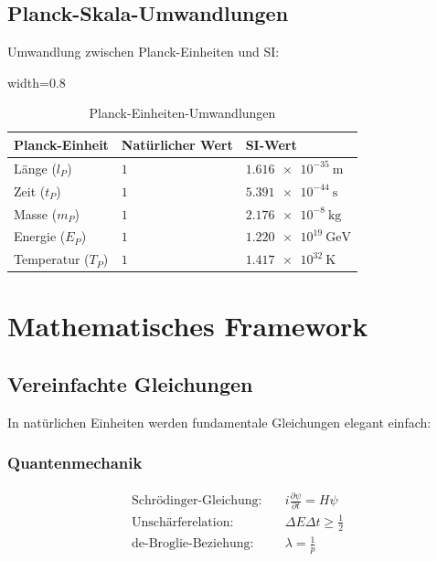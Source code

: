 	\subsection{Planck-Skala-Umwandlungen}
	
	Umwandlung zwischen Planck-Einheiten und SI:
	
	\begin{table}[htbp]
		\centering
		\begin{adjustbox}{width=0.8\textwidth}
			\begin{tabular}{lll}
				\toprule
				\textbf{Planck-Einheit} & \textbf{Natürlicher Wert} & \textbf{SI-Wert} \\
				\midrule
				Länge ($l_P$) & $1$ & $\SI{1.616e-35}{\meter}$ \\
				Zeit ($t_P$) & $1$ & $\SI{5.391e-44}{\second}$ \\
				Masse ($m_P$) & $1$ & $\SI{2.176e-8}{\kilogram}$ \\
				Energie ($E_P$) & $1$ & $\SI{1.220e19}{\giga\electronvolt}$ \\
				Temperatur ($T_P$) & $1$ & $\SI{1.417e32}{\kelvin}$ \\
				\bottomrule
			\end{tabular}
		\end{adjustbox}
		\caption{Planck-Einheiten-Umwandlungen}
		\label{tab:planck_umwandlungen}
	\end{table}
	
	\section{Mathematisches Framework}
	
	\subsection{Vereinfachte Gleichungen}
	
	In natürlichen Einheiten werden fundamentale Gleichungen elegant einfach:
	
	\subsubsection{Quantenmechanik}
	\begin{align}
		\text{Schrödinger-Gleichung:} \quad & i\frac{\partial\psi}{\partial t} = H\psi \\
		\text{Unschärferelation:} \quad & \Delta E \Delta t \geq \frac{1}{2} \\
		\text{de-Broglie-Beziehung:} \quad & \lambda = \frac{1}{p}
	\end{align}
	
